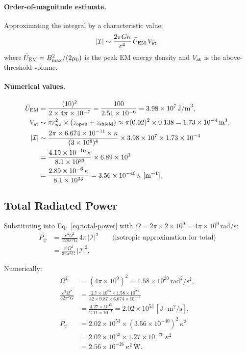\documentclass[11pt]{article}
\begin{document}
\paragraph{Order-of-magnitude estimate.}
Approximating the integral by a characteristic value:
\begin{equation}
|\mathcal{I}| \sim \frac{2\pi G\kappa}{c^4}\,\bar{U}_{\rm EM}\,V_{\rm at},
\end{equation}
where $\bar{U}_{\rm EM} = B_{\max}^2/(2\mu_0)$ is the peak EM energy
density and $V_{\rm at}$ is the above-threshold volume.

\paragraph{Numerical values.}
\begin{align}
\bar{U}_{\rm EM} &= \frac{(10)^2}{2 \times 4\pi \times 10^{-7}}
  = \frac{100}{2.51 \times 10^{-6}} = 3.98 \times 10^{7}\,\text{J/m}^3, \\
V_{\rm at} &\sim \pi r_{\rm sol}^2 \times (z_{\rm open} + z_{\rm shield})
  \approx \pi (0.02)^2 \times 0.138 = 1.73 \times 10^{-4}\,\text{m}^3, \\
|\mathcal{I}| &\sim \frac{2\pi \times 6.674 \times 10^{-11} \times \kappa}
  {(3 \times 10^8)^4} \times 3.98 \times 10^7 \times 1.73 \times 10^{-4} \\
  &= \frac{4.19 \times 10^{-10}\,\kappa}{8.1 \times 10^{33}}
  \times 6.89 \times 10^3 \\
  &= \frac{2.89 \times 10^{-6}\,\kappa}{8.1 \times 10^{33}}
  = 3.56 \times 10^{-40}\,\kappa\,\,[\text{m}^{-1}].
\end{align}

\subsection{Total Radiated Power}

Substituting into Eq.~\eqref{eq:total-power} with $\Omega = 2\pi \times 2
\times 10^9 = 4\pi \times 10^9$\,rad/s:
\begin{align}
P_\psi &= \frac{c^3\Omega^2}{128\pi^3 G}\,4\pi\,|\mathcal{I}|^2
  \qquad\text{(isotropic approximation for total)} \\
  &= \frac{c^3\Omega^2}{32\pi^2 G}\,|\mathcal{I}|^2.
\end{align}

Numerically:
\begin{align}
\Omega^2 &= (4\pi \times 10^9)^2 = 1.58 \times 10^{20}\,\text{rad}^2/\text{s}^2, \\
\frac{c^3\Omega^2}{32\pi^2 G} &= \frac{2.7 \times 10^{25} \times 1.58 \times 10^{20}}
  {32 \times 9.87 \times 6.674 \times 10^{-11}} \\
  &= \frac{4.27 \times 10^{45}}{2.11 \times 10^{-8}}
  = 2.02 \times 10^{53}\,[\text{J}\cdot\text{m}^2/\text{s}], \\
P_\psi &= 2.02 \times 10^{53} \times (3.56 \times 10^{-40})^2\,\kappa^2 \\
  &= 2.02 \times 10^{53} \times 1.27 \times 10^{-79}\,\kappa^2 \\
  &= 2.56 \times 10^{-26}\,\kappa^2\,\text{W}.
\end{align}
\end{document}
